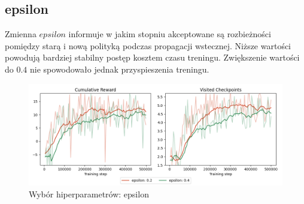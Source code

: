\subsection{epsilon}
Zmienna $epsilon$ informuje w jakim stopniu akceptowane są rozbieżności pomiędzy starą i nową polityką podczas propagacji wstecznej. Niższe wartości powodują bardziej stabilny postęp kosztem czasu treningu. Zwiększenie wartości do $0.4$ nie spowodowało jednak przyspieszenia treningu.
\begin{figure}[H]
    \centering
    \includegraphics[width=\textwidth]{graphs/hyperparameters_epsilon.png}
    \caption{Wybór hiperparametrów: epsilon}
    \label{fig}
\end{figure}

\clearpage
